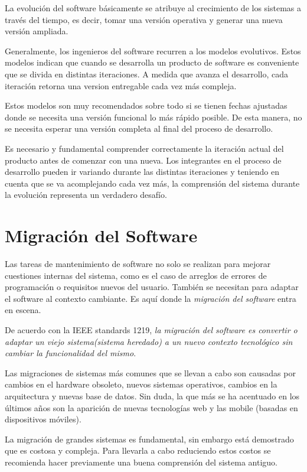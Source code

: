 \documentclass[a4paper,12pt]{report}
\begin{document}
La evolución del software básicamente se atribuye al crecimiento de los sistemas a través del tiempo, es decir, tomar una versión operativa y generar una nueva versión ampliada\cite{KBVR00}.

Generalmente, los ingenieros del software recurren a los modelos evolutivos. Estos modelos indican que cuando se desarrolla un producto de software es conveniente que se divida en distintas iteraciones. A medida que avanza el desarrollo, cada iteración retorna una version entregable cada vez más compleja\cite{RSPMGH02}. 

Estos modelos son muy recomendados sobre todo si se tienen fechas ajustadas donde se necesita una versión funcional lo más rápido posible. De esta manera, no se necesita esperar una versión completa al final del proceso de desarrollo.

Es necesario y fundamental comprender correctamente la iteración actual del producto antes de comenzar con una nueva. Los integrantes en el proceso de desarrollo pueden ir variando durante las distintas iteraciones y teniendo en cuenta que se va acomplejando cada vez más, la comprensión del sistema durante la evolución representa un verdadero desafío.


\section{Migración del Software}

Las tareas de mantenimiento de software no solo se realizan para mejorar cuestiones internas del sistema, como es el caso de arreglos de errores de programación o requisitos nuevos del usuario. También se necesitan para adaptar el software al contexto cambiante. Es aquí donde la \textit{migración del software} entra en escena.
 
De acuerdo con la IEEE standards 1219, \textit{la migración del software es convertir o adaptar un viejo sistema(sistema heredado) a un nuevo contexto tecnológico sin cambiar la funcionalidad del mismo}.

Las migraciones de sistemas más comunes que se llevan a cabo son causadas por cambios en el hardware obsoleto, nuevos sistemas operativos, cambios en la arquitectura y nuevas base de datos. Sin duda, la que más se ha acentuado en los últimos años son la aparición de nuevas tecnologías web y las mobile (basadas en dispositivos móviles)\cite{MMFAF07}.
 
La migración de grandes sistemas es fundamental, sin embargo está demostrado que es costosa y compleja\cite{MMFAF07}. Para llevarla a cabo reduciendo estos costos se recomienda hacer previamente una buena comprensión del sistema antiguo. 
\end{document}
